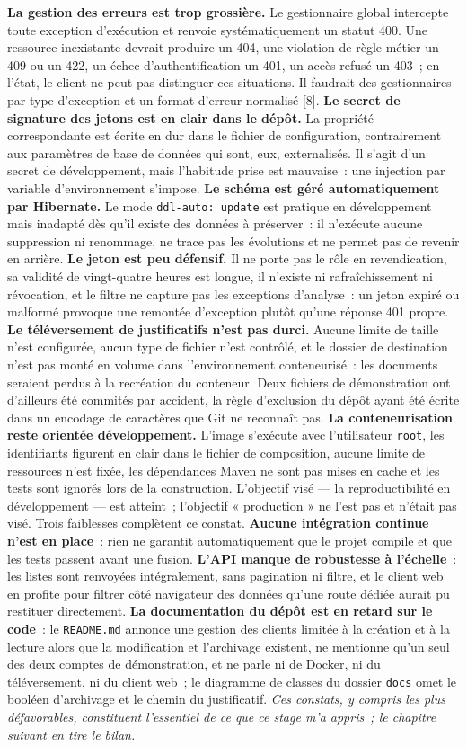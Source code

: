 \documentclass[12pt,a4paper]{report}
\begin{document}
\textbf{La gestion des erreurs est trop grossière.} Le gestionnaire global intercepte toute exception d'exécution et renvoie systématiquement un statut 400. Une ressource inexistante devrait produire un 404, une violation de règle métier un 409 ou un 422, un échec d'authentification un 401, un accès refusé un 403~; en l'état, le client ne peut pas distinguer ces situations. Il faudrait des gestionnaires par type d'exception et un format d'erreur normalisé [8].
\textbf{Le secret de signature des jetons est en clair dans le dépôt.} La propriété correspondante est écrite en dur dans le fichier de configuration, contrairement aux paramètres de base de données qui sont, eux, externalisés. Il s'agit d'un secret de développement, mais l'habitude prise est mauvaise~: une injection par variable d'environnement s'impose.
\textbf{Le schéma est géré automatiquement par Hibernate.} Le mode \texttt{ddl-auto: update} est pratique en développement mais inadapté dès qu'il existe des données à préserver~: il n'exécute aucune suppression ni renommage, ne trace pas les évolutions et ne permet pas de revenir en arrière.
\textbf{Le jeton est peu défensif.} Il ne porte pas le rôle en revendication, sa validité de vingt-quatre heures est longue, il n'existe ni rafraîchissement ni révocation, et le filtre ne capture pas les exceptions d'analyse~: un jeton expiré ou malformé provoque une remontée d'exception plutôt qu'une réponse 401 propre.
\textbf{Le téléversement de justificatifs n'est pas durci.} Aucune limite de taille n'est configurée, aucun type de fichier n'est contrôlé, et le dossier de destination n'est pas monté en volume dans l'environnement conteneurisé~: les documents seraient perdus à la recréation du conteneur. Deux fichiers de démonstration ont d'ailleurs été commités par accident, la règle d'exclusion du dépôt ayant été écrite dans un encodage de caractères que Git ne reconnaît pas.
\textbf{La conteneurisation reste orientée développement.} L'image s'exécute avec l'utilisateur \texttt{root}, les identifiants figurent en clair dans le fichier de composition, aucune limite de ressources n'est fixée, les dépendances Maven ne sont pas mises en cache et les tests sont ignorés lors de la construction. L'objectif visé — la reproductibilité en développement — est atteint~; l'objectif « production » ne l'est pas et n'était pas visé.
Trois faiblesses complètent ce constat. \textbf{Aucune intégration continue n'est en place}~: rien ne garantit automatiquement que le projet compile et que les tests passent avant une fusion. \textbf{L'API manque de robustesse à l'échelle}~: les listes sont renvoyées intégralement, sans pagination ni filtre, et le client web en profite pour filtrer côté navigateur des données qu'une route dédiée aurait pu restituer directement. \textbf{La documentation du dépôt est en retard sur le code}~: le \texttt{README.md} annonce une gestion des clients limitée à la création et à la lecture alors que la modification et l'archivage existent, ne mentionne qu'un seul des deux comptes de démonstration, et ne parle ni de Docker, ni du téléversement, ni du client web~; le diagramme de classes du dossier \texttt{docs} omet le booléen d'archivage et le chemin du justificatif.
\textit{Ces constats, y compris les plus défavorables, constituent l'essentiel de ce que ce stage m'a appris~; le chapitre suivant en tire le bilan.}
\newpage
\end{document}
